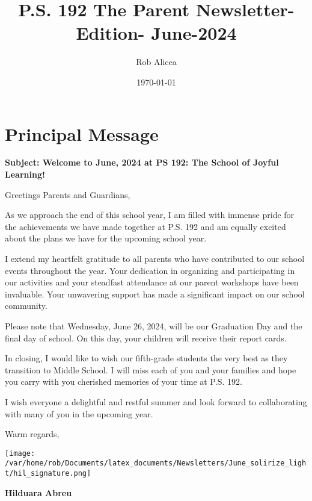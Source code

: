 \documentclass[11pt]{article}
\author{Rob Alicea}
\date{\today}
\title{P.S. 192 The Parent Newsletter- Edition- June-2024}
\begin{document}


\pagenumbering{\fancyhf{}}
\pagestyle{headings}

\fancyhead[R]{\thepage}

\pagestyle{fancy}
\renewcommand{\footrulewidth}{1px}


\clearpage
\clearpage \tableofcontents \clearpage


\section{Principal Message}
\label{sec:orgc464f31}

\textbf{Subject: Welcome to June, 2024 at PS 192: The School of Joyful Learning!}

Greetings Parents and Guardians,

As we approach the end of this school year, I am filled with immense pride for the achievements we have made together at P.S. 192 and am equally excited about the plans we have for the upcoming school year.

I extend my heartfelt gratitude to all parents who have contributed to our school events throughout the year. Your dedication in organizing and participating in our activities and your steadfast attendance at our parent workshops have been invaluable. Your unwavering support has made a significant impact on our school community.

Please note that Wednesday, June 26, 2024, will be our Graduation Day and the final day of school. On this day, your children will receive their report cards.

In closing, I would like to wish our fifth-grade students the very best as they transition to Middle School. I will miss each of you and your families and hope you carry with you cherished memories of your time at P.S. 192.

I wish everyone a delightful and restful summer and look forward to collaborating with many of you in the upcoming year.

Warm regards,

\texttt{[image: /var/home/rob/Documents/latex\_documents/Newsletters/June\_solirize\_light/hil\_signature.png]}

\textbf{Hilduara Abreu}
\end{document}
